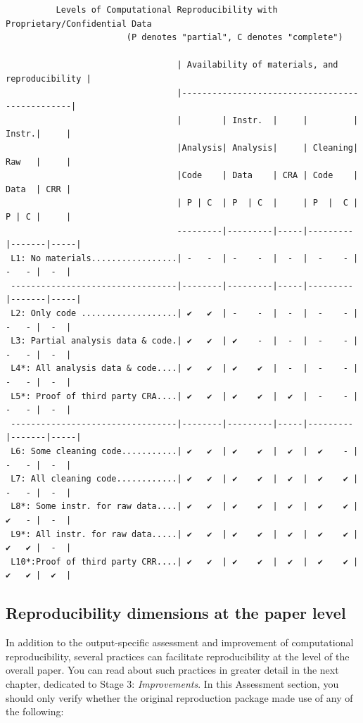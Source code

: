 \documentclass[]{book}
\begin{document}
\begin{itemize}
\begin{verbatim}
          Levels of Computational Reproducibility with Proprietary/Confidential Data
                        (P denotes "partial", C denotes "complete")    

                                  | Availability of materials, and reproducibility |
                                  |------------------------------------------------|
                                  |        | Instr.  |     |         | Instr.|     |
                                  |Analysis| Analysis|     | Cleaning| Raw   |     |
                                  |Code    | Data    | CRA | Code    | Data  | CRR |
                                  | P | C  | P  | C  |     | P  |  C | P | C |     |
                                  ---------|---------|-----|---------|-------|-----|
 L1: No materials.................| -   -  | -    -  |  -  |  -    - | -   - |  -  |
 ---------------------------------|--------|---------|-----|---------|-------|-----|
 L2: Only code ...................| ✔   ✔  | -    -  |  -  |  -    - | -   - |  -  |
 L3: Partial analysis data & code.| ✔   ✔  | ✔    -  |  -  |  -    - | -   - |  -  |
 L4*: All analysis data & code....| ✔   ✔  | ✔    ✔  |  -  |  -    - | -   - |  -  |
 L5*: Proof of third party CRA....| ✔   ✔  | ✔    ✔  |  ✔  |  -    - | -   - |  -  |
 ---------------------------------|--------|---------|-----|---------|-------|-----|
 L6: Some cleaning code...........| ✔   ✔  | ✔    ✔  |  ✔  |  ✔    - | -   - |  -  |
 L7: All cleaning code............| ✔   ✔  | ✔    ✔  |  ✔  |  ✔    ✔ | -   - |  -  |
 L8*: Some instr. for raw data....| ✔   ✔  | ✔    ✔  |  ✔  |  ✔    ✔ | ✔   - |  -  |
 L9*: All instr. for raw data.....| ✔   ✔  | ✔    ✔  |  ✔  |  ✔    ✔ | ✔   ✔ |  -  |
 L10*:Proof of third party CRR....| ✔   ✔  | ✔    ✔  |  ✔  |  ✔    ✔ | ✔   ✔ |  ✔  |
\end{verbatim}
\end{itemize}

\hypertarget{reproducibility-dimensions-at-the-paper-level}{%
\subsection{Reproducibility dimensions at the paper level}\label{reproducibility-dimensions-at-the-paper-level}}

In addition to the output-specific assessment and improvement of computational reproducibility, several practices can facilitate reproducibility at the level of the overall paper. You can read about such practices in greater detail in the next chapter, dedicated to Stage 3: \emph{Improvements}. In this Assessment section, you should only verify whether the original reproduction package made use of any of the following:
\end{document}

